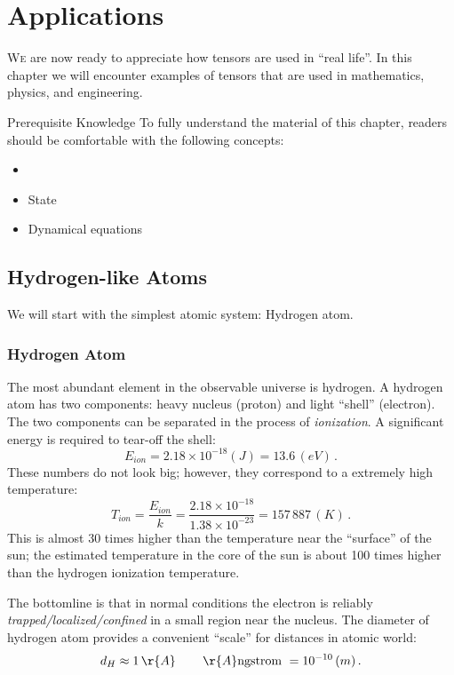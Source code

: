 \graphicspath{{../06Applications/pics/}}

\chapter{Applications}\label{ch:Applications}
\lettrine[lines=2]{\color{darkocre}W}{e} are now ready to appreciate
how tensors are used in ``real life''. In this chapter we will
encounter examples of
tensors that are used in mathematics, physics, and engineering. 

\begin{myprereq}{Prerequisite Knowledge}
	To fully understand the material of this chapter, readers should be comfortable with the following concepts:
	
	\begin{itemize}
		\item \phantom{phantom}
		\vspace{-0.5cm}
		\item State
		\item Dynamical equations
	\end{itemize}	
\end{myprereq}

\section{Hydrogen-like Atoms}
We will start with the simplest atomic system: Hydrogen atom.

\subsection{Hydrogen Atom}
The most abundant element in the observable universe is hydrogen. A
hydrogen atom has two components: heavy nucleus (proton) and light
``shell'' (electron). The two components can be separated in the
process of \emph{ionization}. A significant energy is required to
tear-off the shell:
\[
E_{ion} = 2.18\times 10^{-18} (J) = 13.6\, (eV)\,.
\]
These numbers do not look big; however, they correspond to a extremely
high temperature:
\[
T_{ion} = \frac{E_{ion}}{k} = \frac{2.18\times 10^{-18}}{1.38\times
	10^{-23}} = 157\,887\, (K)\,.
\]
This is almost 30 times higher than the temperature near the
``surface'' of the sun; the estimated temperature in the core of the
sun is about 100 times higher than the hydrogen ionization
temperature.

The bottomline is that in normal conditions the electron is reliably
\emph{trapped/localized/confined} in a small region near the nucleus. The
diameter of hydrogen atom provides a convenient ``scale'' for
distances in atomic world:
\[
d_H \approx 1\, \r{A}\,\qquad \r{A}\textrm{ngstrom } = 10^{-10}\, (m)\,.
\]


